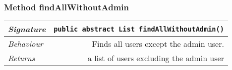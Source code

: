 \begin{adjustwidth}{1.5em}{0pt}
\begin{adjustwidth}{1.5em}{0pt}
\begin{adjustwidth}{1.5em}{0pt}
{\begin{tabularx}{1.0\linewidth}{@{}l R@{}}
      \end{tabularx}}
    \end{adjustwidth}\subsubsection{Method findAllWithoutAdmin\label{edu.kit.hci.soli.repository.UserRepository@findAllWithoutAdmin()}}
    \begin{adjustwidth}{1.5em}{0pt}
      {\begin{tabularx}{1.0\linewidth}{@{}l R@{}}
        \emph{Signature} & \texttt{public abstract \texttt{List} findAllWithoutAdmin()} \\
        \hline
        \emph{Behaviour} & Finds all users except the admin user.    \\
        \hline
        \emph{Returns} & a list of users excluding the admin user  \\
        \hline
  
      \end{tabularx}}
    \end{adjustwidth}
  \end{adjustwidth}
\end{adjustwidth}